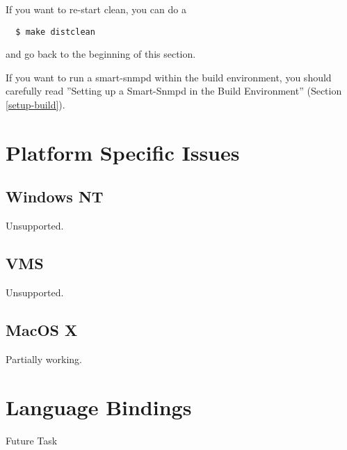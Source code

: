 If you want to re-start clean, you can do a

\begin{verbatim}
  $ make distclean
\end{verbatim}

and go back to the beginning of this section.

If you want to run a smart-snmpd within the build environment, you should
carefully read ''Setting up a Smart-Snmpd in the Build Environment''
(Section \ref{setup-build}).

\section{Platform Specific Issues}

\subsection{Windows NT}

Unsupported.

\subsection{VMS}

Unsupported.

\subsection{MacOS X}

Partially working.

\section{Language Bindings}

Future Task


